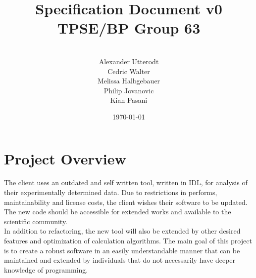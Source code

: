 \documentclass[
	points=true,
 	nenglish,
	colorbacktitle,
	identbarcolor=2b,
	accentcolor=2b
	]{tudaexercise}
\begin{document}
\title[TUDaExercise]{Specification Document v0 TPSE/BP Group 63}
\author{
 \\
Alexander Utterodt\\
Cedric Walter \\
Melissa Halbgebauer \\
Philip Jovanovic \\
Kian Pasani
}
\date{\today}
\maketitle

\section{Project Overview}

The client uses an outdated and self written tool, written in IDL, for analysis of their experimentally determined data. Due to restrictions in performs, maintainability and license costs, the client wishes their software to be updated. The new code should be accessible for extended works and available to the scientific community. \\
In addition to refactoring, the new tool will also be extended by other desired features and optimization of calculation algorithms. The main goal of this project is to create a robust software in an easily understandable manner that can be maintained and extended by individuals that do not necessarily have deeper knowledge of programming.
\end{document}
